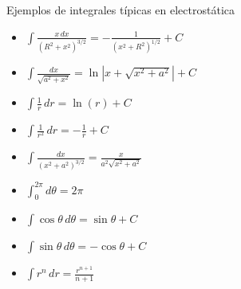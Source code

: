 \documentclass[addpoints,12pt]{exam}
\begin{document}
\begin{formbox}{Ejemplos de integrales t\'ipicas en electrost\'atica}
\noindent
\begin{minipage}{0.52\textwidth}
\begin{itemize}\setlength\itemsep{1pt}
    \item $\displaystyle\int \frac{x\,dx}{(R^2 + x^2)^{3/2}} = -\frac{1}{(x^2 + R^2)^{1/2}} + C$
    \item $\displaystyle\int \frac{dx}{\sqrt{a^2 + x^2}} = \ln\left|x + \sqrt{x^2 + a^2}\right| + C$
    \item $\displaystyle\int \frac{1}{r}\,dr = \ln(r) + C$
    \item $\displaystyle\int \frac{1}{r^2}\,dr = -\frac{1}{r} + C$
    \item $\displaystyle\int \frac{dx}{(x^2 + a^2)^{3/2}} = \frac{x}{a^2\sqrt{x^2 + a^2}}$
\end{itemize}
\end{minipage}%
\begin{minipage}{0.46\textwidth}
\begin{itemize}\setlength\itemsep{1pt}
    \item $\displaystyle\int_0^{2\pi} d\theta = 2\pi$
    \item $\displaystyle\int \cos\theta\,d\theta = \sin\theta + C$
    \item $\displaystyle\int \sin\theta\,d\theta = -\cos\theta + C$
    \item $\displaystyle\int r^n\,dr = \frac{r^{n+1}}{n+1}$
\end{itemize}
\end{minipage}
\end{formbox}
\end{document}
